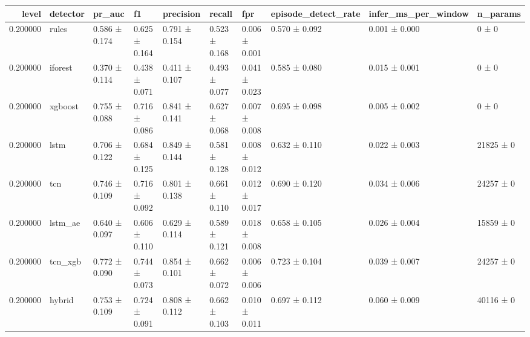 \begin{tabular}{rlllllllll}
\toprule
level & detector & pr\_auc & f1 & precision & recall & fpr & episode\_detect\_rate & infer\_ms\_per\_window & n\_params \\
\midrule
0.200000 & rules & 0.586 ± 0.174 & 0.625 ± 0.164 & 0.791 ± 0.154 & 0.523 ± 0.168 & 0.006 ± 0.001 & 0.570 ± 0.092 & 0.001 ± 0.000 & 0 ± 0 \\
0.200000 & iforest & 0.370 ± 0.114 & 0.438 ± 0.071 & 0.411 ± 0.107 & 0.493 ± 0.077 & 0.041 ± 0.023 & 0.585 ± 0.080 & 0.015 ± 0.001 & 0 ± 0 \\
0.200000 & xgboost & 0.755 ± 0.088 & 0.716 ± 0.086 & 0.841 ± 0.141 & 0.627 ± 0.068 & 0.007 ± 0.008 & 0.695 ± 0.098 & 0.005 ± 0.002 & 0 ± 0 \\
0.200000 & lstm & 0.706 ± 0.122 & 0.684 ± 0.125 & 0.849 ± 0.144 & 0.581 ± 0.128 & 0.008 ± 0.012 & 0.632 ± 0.110 & 0.022 ± 0.003 & 21825 ± 0 \\
0.200000 & tcn & 0.746 ± 0.109 & 0.716 ± 0.092 & 0.801 ± 0.138 & 0.661 ± 0.110 & 0.012 ± 0.017 & 0.690 ± 0.120 & 0.034 ± 0.006 & 24257 ± 0 \\
0.200000 & lstm\_ae & 0.640 ± 0.097 & 0.606 ± 0.110 & 0.629 ± 0.114 & 0.589 ± 0.121 & 0.018 ± 0.008 & 0.658 ± 0.105 & 0.026 ± 0.004 & 15859 ± 0 \\
0.200000 & tcn\_xgb & 0.772 ± 0.090 & 0.744 ± 0.073 & 0.854 ± 0.101 & 0.662 ± 0.072 & 0.006 ± 0.006 & 0.723 ± 0.104 & 0.039 ± 0.007 & 24257 ± 0 \\
0.200000 & hybrid & 0.753 ± 0.109 & 0.724 ± 0.091 & 0.808 ± 0.112 & 0.662 ± 0.103 & 0.010 ± 0.011 & 0.697 ± 0.112 & 0.060 ± 0.009 & 40116 ± 0 \\
\bottomrule
\end{tabular}
